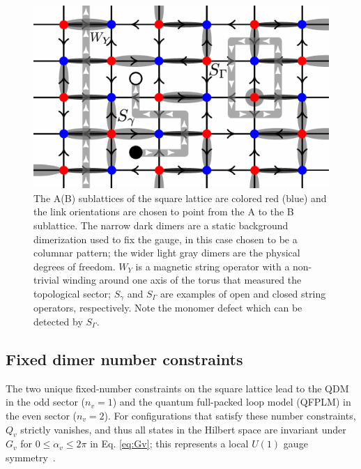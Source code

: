 \documentclass[twocolumn,prb,aps,floatfix,superscriptaddress]{revtex4-1}
\newcommand{\Eqref}[1]{Eq. \eqref{#1}}
\begin{document}
\begin{figure}[tpb]
    \centering
    \includegraphics[width=1.0\columnwidth]{mag_loops_on_orntd_lat.pdf}
    \caption{The A(B) sublattices of the square lattice are colored red (blue) and the link orientations are chosen to point from the A to the B sublattice. The narrow dark dimers are a static background dimerization used to fix the gauge, in this case chosen to be a columnar pattern; the wider light gray dimers are the physical degrees of freedom. $W_Y$ is a magnetic string operator with a non-trivial winding around one axis of the torus that measured the topological sector; $S_\gamma$ and $S_\Gamma$ are examples of open and closed string operators, respectively. Note the monomer defect which can be detected by $S_\Gamma$.}
    \label{fig:orientedSL}
\end{figure}

\subsection{Fixed dimer number constraints}

The two unique fixed-number constraints on the square lattice lead to the QDM in the odd sector ($n_v = 1$) and the quantum full-packed loop model (QFPLM) in the even sector ($n_v = 2$). For configurations that satisfy these number constraints, $Q_v$ strictly vanishes, and thus all states in the Hilbert space are invariant under $G_v$ for $0 \leq \alpha_v \leq 2 \pi$ in \Eqref{eq:Gv}; this represents a local $U(1)$ gauge symmetry~\cite{Moessner2001}. 
\end{document}
